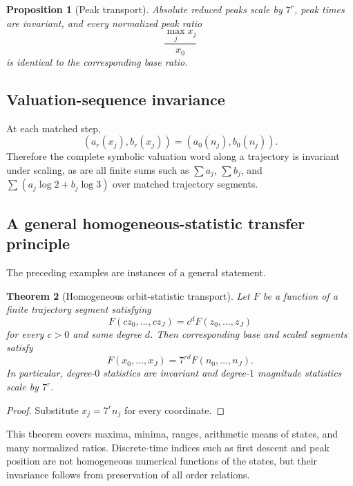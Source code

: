 \documentclass[11pt]{article}
\newtheorem{theorem}{Theorem}[section]
\newtheorem{proposition}[theorem]{Proposition}
\begin{document}
\begin{proposition}[Peak transport]
Absolute reduced peaks scale by $7^r$, peak times are invariant, and every normalized peak ratio
\[
\frac{\max_j x_j}{x_0}
\]
is identical to the corresponding base ratio.
\end{proposition}

\subsection{Valuation-sequence invariance}
At each matched step,
\begin{equation}
(a_r(x_j),b_r(x_j))=(a_0(n_j),b_0(n_j)).
\label{eq:valsequence}
\end{equation}
Therefore the complete symbolic valuation word along a trajectory is invariant under scaling, as are all finite sums such as $\sum a_j$, $\sum b_j$, and $\sum(a_j\log2+b_j\log3)$ over matched trajectory segments.

\subsection{A general homogeneous-statistic transfer principle}
The preceding examples are instances of a general statement.

\begin{theorem}[Homogeneous orbit-statistic transport]
Let $F$ be a function of a finite trajectory segment satisfying
\[
F(cz_0,\ldots,cz_J)=c^dF(z_0,\ldots,z_J)
\]
for every $c>0$ and some degree $d$. Then corresponding base and scaled segments satisfy
\begin{equation}
F(x_0,\ldots,x_J)=7^{rd}F(n_0,\ldots,n_J).
\label{eq:homogstat}
\end{equation}
In particular, degree-$0$ statistics are invariant and degree-$1$ magnitude statistics scale by $7^r$.
\end{theorem}
\begin{proof}
Substitute $x_j=7^rn_j$ for every coordinate.
\end{proof}

This theorem covers maxima, minima, ranges, arithmetic means of states, and many normalized ratios. Discrete-time indices such as first descent and peak position are not homogeneous numerical functions of the states, but their invariance follows from preservation of all order relations.
\end{document}
